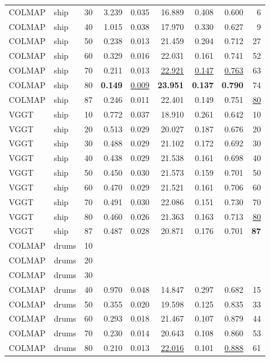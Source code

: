 \begin{table}[H]
\begin{tabular}{llrrrrrrr}
COLMAP & ship & 30 & 3.239 & 0.035 & 16.889 & 0.408 & 0.600 & 6 \\
COLMAP & ship & 40 & 1.015 & 0.038 & 17.970 & 0.330 & 0.627 & 9 \\
COLMAP & ship & 50 & 0.238 & 0.013 & 21.459 & 0.204 & 0.712 & 27 \\
COLMAP & ship & 60 & 0.329 & 0.016 & 22.031 & 0.161 & 0.741 & 52 \\
COLMAP & ship & 70 & 0.211 & 0.013 & \underline{22.921} & \underline{0.147} & \underline{0.763} & 63 \\
COLMAP & ship & 80 & \textbf{0.149} & \underline{0.009} & \textbf{23.951} & \textbf{0.137} & \textbf{0.790} & 74 \\
COLMAP & ship & 87 & 0.246 & 0.011 & 22.401 & 0.149 & 0.751 & \underline{80} \\
VGGT & ship & 10 & 0.772 & 0.037 & 18.910 & 0.261 & 0.642 & 10 \\
VGGT & ship & 20 & 0.513 & 0.029 & 20.027 & 0.187 & 0.676 & 20 \\
VGGT & ship & 30 & 0.488 & 0.029 & 21.102 & 0.172 & 0.692 & 30 \\
VGGT & ship & 40 & 0.438 & 0.029 & 21.538 & 0.161 & 0.698 & 40 \\
VGGT & ship & 50 & 0.450 & 0.030 & 21.573 & 0.159 & 0.701 & 50 \\
VGGT & ship & 60 & 0.470 & 0.029 & 21.521 & 0.161 & 0.706 & 60 \\
VGGT & ship & 70 & 0.491 & 0.030 & 22.086 & 0.151 & 0.730 & 70 \\
VGGT & ship & 80 & 0.460 & 0.026 & 21.363 & 0.163 & 0.713 & \underline{80} \\
VGGT & ship & 87 & 0.487 & 0.028 & 20.871 & 0.176 & 0.701 & \textbf{87} \\
\midrule
COLMAP & drums & 10 &  &  &  &  &  &  \\
COLMAP & drums & 20 &  &  &  &  &  &  \\
COLMAP & drums & 30 &  &  &  &  &  &  \\
COLMAP & drums & 40 & 0.970 & 0.048 & 14.847 & 0.297 & 0.682 & 15 \\
COLMAP & drums & 50 & 0.355 & 0.020 & 19.598 & 0.125 & 0.835 & 33 \\
COLMAP & drums & 60 & 0.293 & 0.018 & 21.467 & 0.107 & 0.879 & 44 \\
COLMAP & drums & 70 & 0.230 & 0.014 & 20.643 & 0.108 & 0.860 & 53 \\
COLMAP & drums & 80 & 0.210 & 0.013 & \underline{22.016} & 0.101 & \underline{0.888} & 61 \\

\end{tabular}
\end{table}
